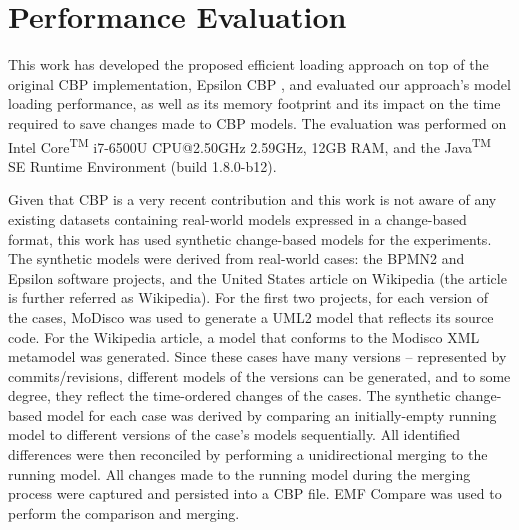 {\section{Performance Evaluation}
\label{sec:performance_evaluation}

This work has developed the proposed efficient loading approach on top of the original CBP implementation, Epsilon CBP \cite{DBLP:conf/models/YohannisKP17,epsilonlabs2019emfcbp}, and evaluated our approach's model loading performance, as well as its memory footprint and its impact on the time required to save changes made to CBP models. The evaluation was performed on Intel\textsuperscript{\textregistered} Core\textsuperscript{TM} i7-6500U CPU@2.50GHz 2.59GHz, 12GB RAM, and the Java\textsuperscript{TM} SE Runtime Environment (build 1.8.0-b12).

Given that CBP is a very recent contribution and this work is not aware of any existing datasets containing real-world models expressed in a change-based format, this work has used synthetic change-based models for the experiments. The synthetic models were derived from real-world cases: the BPMN2 \cite{eclipse2017bpmn2,eclipse2018bpmn2git} and Epsilon \cite{eclipse2017epsilon,eclipse2018epsilongit} software projects, and the United States article \cite{wikipedia2018us} on Wikipedia (the article is further referred as Wikipedia). For the first two projects, for each version of the cases, MoDisco \cite{DBLP:journals/infsof/BruneliereCDM14} was used to generate a UML2 \cite{eclipse2017uml2} model that reflects its source code. For the Wikipedia article, a model that conforms to the Modisco XML metamodel \cite{eclipse2018modiscoxml} was generated. Since these cases have many versions -- represented by commits/revisions, different models of the versions can be generated, and to some degree, they reflect the time-ordered changes of the cases. The synthetic change-based model for each case was derived by comparing an initially-empty running model to different versions of the case's models sequentially. All identified differences were then reconciled by performing a unidirectional merging to the running model. All changes made to the running model during the merging process were captured and persisted into a CBP file. EMF Compare was used \cite{eclipse2017compare} to perform the comparison and merging.

}
